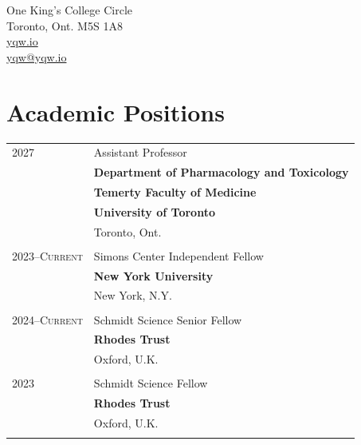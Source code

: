 \begin{center}

One King's College Circle\\
Toronto, Ont. M5S 1A8\\
\url{yqw.io}\\
\href{mailto:yqw@yqw.io}{yqw@yqw.io}\\
\end{center}

\vspace{10pt}


\section{Academic Positions}
\begin{longtable}{p{} p{} }
2027 & Assistant Professor \\
& \textbf{Department of Pharmacology and Toxicology} \\
& \textbf{Temerty Faculty of Medicine} \\
& \textbf{University of Toronto} \\
& Toronto, Ont. \\\\

\textsc{2023--Current} & Simons Center Independent Fellow \\
& \textbf{New York University} \\
& New York, N.Y. \\\\

\textsc{2024--Current} & Schmidt Science Senior Fellow \\
& \textbf{Rhodes Trust} \\
& Oxford, U.K. \\\\

\textsc{2023} & Schmidt Science Fellow \\
& \textbf{Rhodes Trust} \\
& Oxford, U.K. \\\\



\end{longtable}

